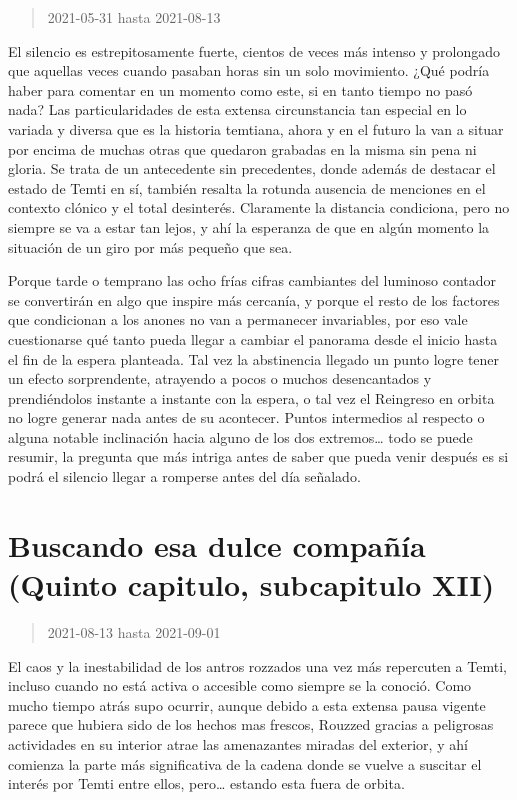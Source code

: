 \documentclass[
  spanish,
]{book}
\begin{document}
\begin{quote}
2021-05-31 hasta 2021-08-13
\end{quote}

El silencio es estrepitosamente fuerte, cientos de veces más intenso y prolongado que aquellas veces cuando pasaban horas sin un solo movimiento. ¿Qué podría haber para comentar en un momento como este, si en tanto tiempo no pasó nada?
Las particularidades de esta extensa circunstancia tan especial en lo variada y diversa que es la historia temtiana, ahora y en el futuro la van a situar por encima de muchas otras que quedaron grabadas en la misma sin pena ni gloria. Se trata de un antecedente sin precedentes, donde además de destacar el estado de Temti en sí, también resalta la rotunda ausencia de menciones en el contexto clónico y el total desinterés. Claramente la distancia condiciona, pero no siempre se va a estar tan lejos, y ahí la esperanza de que en algún momento la situación de un giro por más pequeño que sea.

Porque tarde o temprano las ocho frías cifras cambiantes del luminoso contador se convertirán en algo que inspire más cercanía, y porque el resto de los factores que condicionan a los anones no van a permanecer invariables, por eso vale cuestionarse qué tanto pueda llegar a cambiar el panorama desde el inicio hasta el fin de la espera planteada. Tal vez la abstinencia llegado un punto logre tener un efecto sorprendente, atrayendo a pocos o muchos desencantados y prendiéndolos instante a instante con la espera, o tal vez el Reingreso en orbita no logre generar nada antes de su acontecer.
Puntos intermedios al respecto o alguna notable inclinación hacia alguno de los dos extremos\ldots{}
todo se puede resumir, la pregunta que más intriga antes de saber que pueda venir después es si podrá el silencio llegar a romperse antes del día señalado.

\hypertarget{buscando-esa-dulce-compauxf1uxeda-quinto-capitulo-subcapitulo-xii}{%
\section{Buscando esa dulce compañía (Quinto capitulo, subcapitulo XII)}\label{buscando-esa-dulce-compauxf1uxeda-quinto-capitulo-subcapitulo-xii}}

\begin{quote}
2021-08-13 hasta 2021-09-01
\end{quote}

El caos y la inestabilidad de los antros rozzados una vez más repercuten a Temti, incluso cuando no está activa o accesible como siempre se la conoció. Como mucho tiempo atrás supo ocurrir, aunque debido a esta extensa pausa vigente parece que hubiera sido de los hechos mas frescos, Rouzzed gracias a peligrosas actividades en su interior atrae las amenazantes miradas del exterior, y ahí comienza la parte más significativa de la cadena donde se vuelve a suscitar el interés por Temti entre ellos, pero\ldots{} estando esta fuera de orbita.
\end{document}

